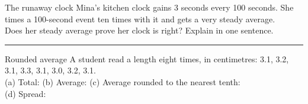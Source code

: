 \begin{puzzle}{The runaway clock}
Mina's kitchen clock gains 3 seconds every 100 seconds. She times a 100-second event ten times with it and gets a very steady average.\\
Does her steady average prove her clock is right? Explain in one sentence.\\
\rule{\linewidth}{0.5pt}
\end{puzzle}

\begin{puzzle}{Rounded average}
A student read a length eight times, in centimetres: 3.1, 3.2, 3.1, 3.3, 3.1, 3.0, 3.2, 3.1.\\
(a) Total: \wline[1.6cm] \quad (b) Average: \wline[1.6cm] \quad (c) Average rounded to the nearest tenth: \wline[1.6cm]\\
(d) Spread: \wline[1.6cm]
\end{puzzle}
\clearpage
